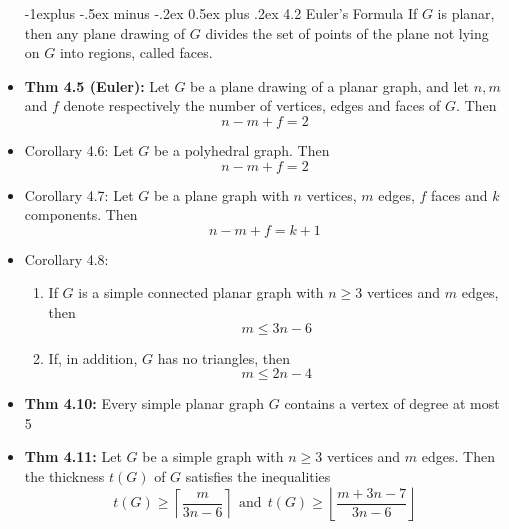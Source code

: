 \documentclass[10pt,landscape]{article}
\makeatletter
\renewcommand{\subsection}{\@startsection{subsection}{2}{0mm}%
                                {-1explus -.5ex minus -.2ex}%
                                {0.5ex plus .2ex}%
                                {\normalfont\normalsize\bfseries}}
\makeatother
\begin{document}
\begin{multicols}{2}
\begin{itemize}
        \subsection{4.2 Euler's Formula}
        If $G$ is planar, then any plane drawing of $G$ divides the set of points of the plane not lying on $G$ into regions, called faces.
        \item \textbf{Thm 4.5 (Euler):} Let $G$ be a plane drawing of a planar graph, and let $n, m$ and $f$ denote respectively the number of vertices, edges and faces of $G$. Then $$n-m+f=2$$
        \item Corollary 4.6: Let $G$ be a polyhedral graph. Then\\ $$n-m+f=2$$
        \item Corollary 4.7: Let $G$ be a plane graph with $n$ vertices, $m$ edges, $f$ faces and $k$ components. Then $$n-m+f = k+1$$
        \item Corollary 4.8: \begin{enumerate}
            \item If $G$ is a simple connected planar graph with $n\ge 3$ vertices and $m$ edges, then $$m\le 3n-6$$
            \item If, in addition, $G$ has no triangles, then \\$$m\le2n-4$$
        \end{enumerate}
        \item \textbf{Thm 4.10:} Every simple planar graph $G$ contains a vertex of degree at most 5
        \item \textbf{Thm 4.11:} Let $G$ be a simple graph with $n\ge3$ vertices and $m$ edges. Then the thickness $t(G)$ of $G$ satisfies the inequalities\\
        $$t(G)\ge \left\lceil\frac{m}{3n-6}\right\rceil \ \ \text{and} \ \ t(G)\ge \left\lfloor \frac{m+3n-7}{3n-6}\right\rfloor$$

\end{itemize}
\end{multicols}
\end{document}
